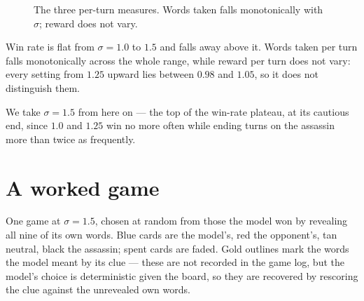\documentclass[12pt]{article}
\begin{document}
\begin{figure}[H]
\centering
{}
\caption*{\footnotesize The three per-turn measures. Words taken falls
monotonically with $\sigma$; reward does not vary.}
\end{figure}

Win rate is flat from $\sigma = 1.0$ to $1.5$ and falls away above it. Words
taken per turn falls monotonically across the whole range, while reward per
turn does not vary: every setting from $1.25$ upward lies between $0.98$ and
$1.05$, so it does not distinguish them.

We take $\sigma = 1.5$ from here on --- the top of the win-rate plateau, at its
cautious end, since $1.0$ and $1.25$ win no more often while ending turns on
the assassin more than twice as frequently.

\section{A worked game}
\label{sec:worked}

One game at $\sigma = 1.5$, chosen at random from those the model won by
revealing all nine of its own words. Blue cards are the model's, red the
opponent's, tan neutral, black the assassin; spent cards are faded. Gold
outlines mark the words the model meant by its clue --- these are not recorded
in the game log, but the model's choice is deterministic given the board, so
they are recovered by rescoring the clue against the unrevealed own words.
\end{document}
